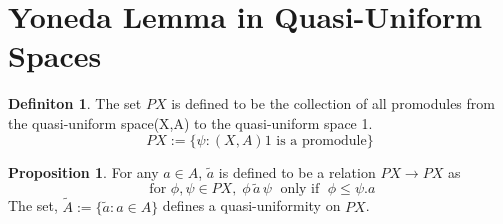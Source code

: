 \documentclass[18pt,a4paper]{article}
\makeatletter
\theoremstyle{definition}
\newtheorem{definition}[theorem]{Definiton}
\newtheorem{proop}[theorem]{Proposition}
\newcommand{\carrow}{}%
\DeclareRobustCommand{\carrow}{%
	\mathrel{\vphantom{\rightarrow}\mathpalette\circle@arrow\relax}%
}
\newcommand{\circle@arrow}[2]{%
	\m@th
	\ooalign{%
		\hidewidth$#1\circ\mkern1mu$\hidewidth\cr
	$#1\longrightarrow$\cr}%
}
\makeatother
\begin{document}
\section{Yoneda Lemma in Quasi-Uniform Spaces}
\begin{definition}%
	The set $PX$ is defined to be the collection of all promodules from the quasi-uniform space(X,A)
	to the quasi-uniform space 1.
	\[PX:=\{\psi :(X,A) \carrow 1 \text{ is a promodule} \}\]
\end{definition}
\begin{proop}%
	For any $a\in A$, $\tilde{a}$ is defined to be a relation $PX \to PX$ as
	\[ \text{ for } \phi,\psi \in PX, \; \phi \, \tilde{a} \, \psi \; \text{ only if } \;
	\phi \leq \psi.a \]
	The set, $\tilde{A}:=\{\tilde{a}:a \in A\}$ defines a quasi-uniformity on $PX$.
\end{proop}
\end{document}
